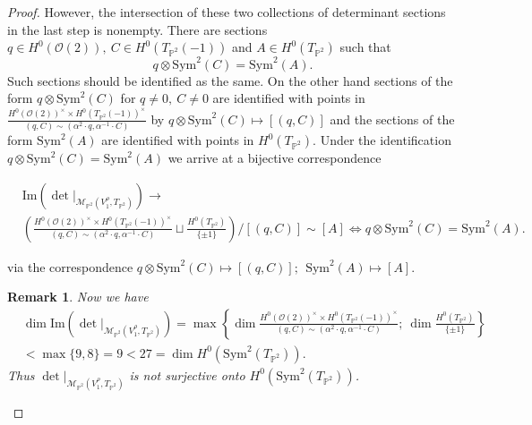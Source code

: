 \documentclass[10pt,a4paper]{amsart}
\newtheorem{remark}{Remark}
\begin{document}
\begin{proof}
However, the intersection of these two collections of determinant sections in the last step is nonempty. There are sections $q\in H^0(\mathcal{O}(2)),~ C\in H^0(T_{\mathbb{P}^2}(-1))$ and $A\in H^0(T_{\mathbb{P}^2})$ such that $$q\otimes\mbox{Sym}^2(C) = \mbox{Sym}^2(A).$$ Such sections should be identified as the same. On the other hand sections of the form $q\otimes\mbox{Sym}^2(C)$ for $q\neq 0,~ C\neq 0$ are identified with points in $\frac{H^0(\mathcal{O}(2))^\times\times H^0(T_{\mathbb{P}^2}(-1))^\times}{(q, C)\sim (\alpha^2\cdot q, \alpha^{-1}\cdot C)}$ by $q\otimes\mbox{Sym}^2(C)\mapsto [(q, C)]$ and the sections of the form $\mbox{Sym}^2(A)$ are identified with points in $H^0(T_{\mathbb{P}^2})$. Under the identification $q\otimes\mbox{Sym}^2(C) = \mbox{Sym}^2(A)$ we arrive at a bijective correspondence 

\begin{align*}
&\mbox{Im}\left(\det|_{\mathcal{M}_{\mathbb{P}^2}(V_1^\rho, T_{\mathbb{P}^2})}\right)\to\\
&\left(\frac{H^0(\mathcal{O}(2))^\times\times H^0(T_{\mathbb{P}^2}(-1))^\times}{(q, C)\sim (\alpha^2\cdot q, \alpha^{-1}\cdot C)}\sqcup\frac{H^0(T_{\mathbb{P}^2})}{\{\pm 1\}}\right)\bigg/[(q, C)]\sim [A]\iff q\otimes\mbox{Sym}^2(C) = \mbox{Sym}^2(A).
\end{align*}

via the correspondence $q\otimes\mbox{Sym}^2(C)\mapsto [(q, C)];~~\mbox{Sym}^2(A)\mapsto [A]$.
\begin{remark}
Now we have
\begin{align*}
&\dim \mbox{Im}\left(\det|_{\mathcal{M}_{\mathbb{P}^2}(V_1^\rho, T_{\mathbb{P}^2})}\right) = \max \left\{\dim \frac{H^0(\mathcal{O}(2))^\times\times H^0(T_{\mathbb{P}^2}(-1))^\times}{(q, C)\sim (\alpha^2\cdot q, \alpha^{-1}\cdot C)};~\dim \frac{H^0(T_{\mathbb{P}^2})}{\{\pm 1\}}\right\}\\
& < \max\{9, 8\} = 9 < 27 = \dim H^0(\mbox{Sym}^2(T_{\mathbb{P}^2})).
\end{align*} Thus $\det|_{\mathcal{M}_{\mathbb{P}^2}(V_1^\rho, T_{\mathbb{P}^2})}$ is not surjective onto $H^0(\mbox{Sym}^2(T_{\mathbb{P}^2}))$.
\end{remark}



\end{proof}
\end{document}
